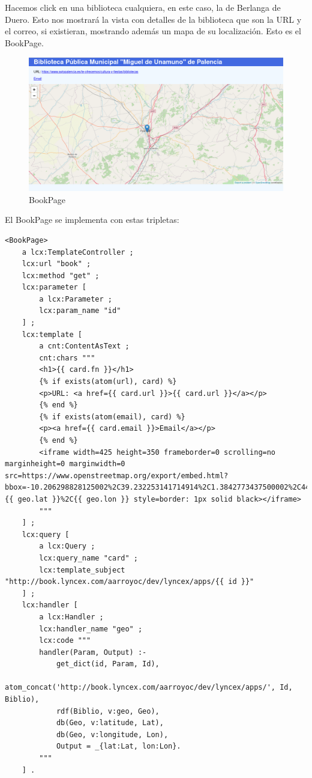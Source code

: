 \documentclass[12pt]{report} %
\begin{document}
Hacemos click en una biblioteca cualquiera, en este caso, la de Berlanga de Duero. Esto nos mostrará la vista con detalles de la biblioteca que son la URL y el correo, si existieran, mostrando además un mapa de su localización. Esto es el BookPage.

\begin{figure}
    \centering
    \includegraphics[width=\textwidth]{tour/bibliocyl3.png}
    \caption{BookPage}
    \label{fig:bibliocyl3}
\end{figure}

El BookPage se implementa con estas tripletas:
\begin{lstlisting}
<BookPage>
    a lcx:TemplateController ;
    lcx:url "book" ;
    lcx:method "get" ;
    lcx:parameter [
        a lcx:Parameter ;
        lcx:param_name "id"
    ] ;
    lcx:template [
        a cnt:ContentAsText ;
        cnt:chars """
        <h1>{{ card.fn }}</h1>
        {% if exists(atom(url), card) %}
        <p>URL: <a href={{ card.url }}>{{ card.url }}</a></p>
        {% end %}
        {% if exists(atom(email), card) %}
        <p><a href={{ card.email }}>Email</a></p>
        {% end %}
        <iframe width=425 height=350 frameborder=0 scrolling=no marginheight=0 marginwidth=0 src=https://www.openstreetmap.org/export/embed.html?bbox=-10.206298828125002%2C39.232253141714914%2C1.3842773437500002%2C44.33956524809713&marker={{ geo.lat }}%2C{{ geo.lon }} style=border: 1px solid black></iframe>
        """
    ] ;
    lcx:query [
        a lcx:Query ;
        lcx:query_name "card" ;
        lcx:template_subject "http://book.lyncex.com/aarroyoc/dev/lyncex/apps/{{ id }}"
    ] ;
    lcx:handler [
        a lcx:Handler ;
        lcx:handler_name "geo" ;
        lcx:code """
        handler(Param, Output) :-
            get_dict(id, Param, Id),
            atom_concat('http://book.lyncex.com/aarroyoc/dev/lyncex/apps/', Id, Biblio),
            rdf(Biblio, v:geo, Geo),
            db(Geo, v:latitude, Lat),
            db(Geo, v:longitude, Lon),
            Output = _{lat:Lat, lon:Lon}.
        """
    ] .
\end{lstlisting}
\end{document}
